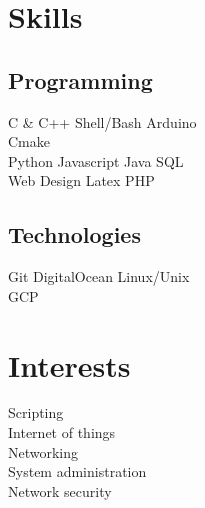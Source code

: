 \documentclass[]{deedy-resume-openfont}
\begin{document}
\begin{minipage}[t][18cm]{0.33\textwidth}


\section{Skills}
\subsection{Programming}
C \& C++ \textbullet{}   Shell/Bash \textbullet{} Arduino \\
Cmake\\
Python \textbullet{} Javascript \textbullet{} Java \textbullet{} SQL\\ 
Web Design \textbullet{} Latex \textbullet{} PHP
\sectionsep
\subsection{Technologies}
Git \textbullet{} DigitalOcean \textbullet{} Linux/Unix\\
GCP
\sectionsep

\section{Interests}
\textbullet{} Scripting\\
\textbullet{} Internet of things \\
\textbullet{} Networking \\
\textbullet{} System administration \\
\textbullet{} Network security
\sectionsep


\end{minipage}
\end{document}
